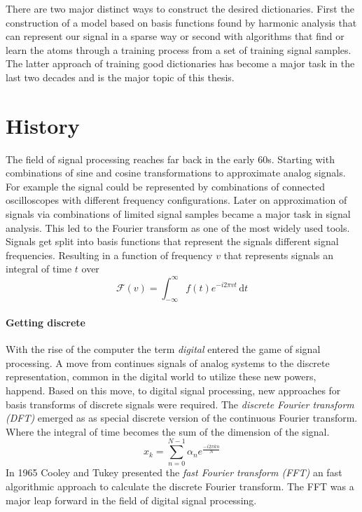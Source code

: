 There are two major distinct ways to construct the desired dictionaries. 
First the construction of a model based on basis functions found by harmonic
analysis that can represent our signal in a sparse way or second with algorithms
that find or learn the atoms through a training process from a set of training
signal samples. The latter approach of training good dictionaries has become a
major task in the last two decades\cite{Mairal2010} and is the major topic of
this thesis.



\section{History}
\label{sec:history}
The field of signal processing reaches far back in the early 60s.
Starting with combinations of sine and cosine transformations to approximate
analog signals. For example the signal could be represented by combinations of
connected oscilloscopes with different frequency configurations. Later on
approximation of signals via combinations of limited signal samples became a
major task in signal analysis.
This led to the Fourier transform as one of the most widely
used tools. Signals get split into basis functions that represent the
signals different signal frequencies. 
Resulting in a function of frequency $v$ that represents signals an integral
of time $t$ over  
\begin{equation*}
\mathcal{F}\left(v\right) = \int_{-\infty}^{\infty} \! f(t)e^{-i2\pi vt} \,
\mathrm{d}t
\end{equation*}

\paragraph{Getting discrete}
With the rise of the computer the term \emph{digital} entered the
game of signal processing. A move from continues signals of analog systems to
the discrete representation, common in the digital world to utilize these new
powers, happend. Based on this move, to digital signal processing, new
approaches for basis transforms of discrete signals were required. The
\emph{discrete Fourier transform (DFT)} emerged as as special discrete version
of the continuous
Fourier transform. Where the integral of time becomes the sum of the dimension
of the signal. 
\begin{equation*}
 x_k = \sum_{n=0}^{N-1}\alpha_ne^{\frac{-i2\pi kn}{N}}
\end{equation*}
In 1965 Cooley and Tukey presented\cite{Cooley1965} the \emph{fast Fourier
transform (FFT)} an fast algorithmic approach to calculate the discrete
Fourier transform. 
The FFT was a major leap forward in the field of digital signal processing.

